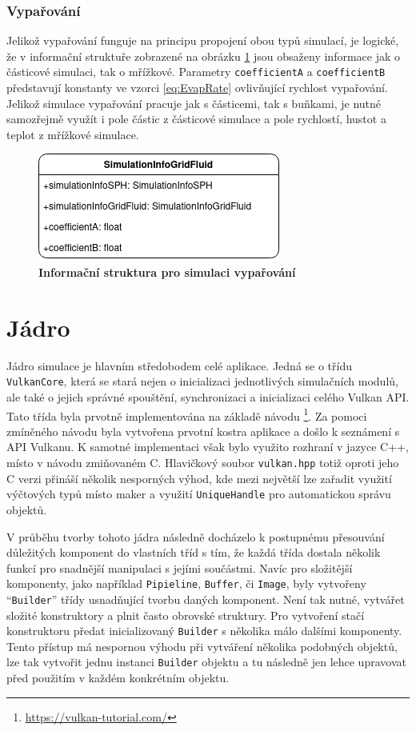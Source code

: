 \subsubsection{Vypařování}
Jelikož vypařování funguje na principu propojení obou typů simulací, je logické, že v informační struktuře zobrazené na obrázku \ref{fig:structsEvap} jsou obsaženy informace jak o částicové simulaci, tak o mřížkové. Parametry \texttt{coefficientA} a \texttt{coefficientB} představují konstanty ve vzorci \ref{eq:EvapRate} ovlivňující rychlost vypařování. Jelikož simulace vypařování pracuje jak s částicemi, tak s buňkami, je nutné samozřejmě využít i pole částic z částicové simulace a pole rychlostí, hustot a teplot z mřížkové simulace.

\begin{figure}[hbt]
	\centering
	\captionsetup{justification=centering}
	\includegraphics[scale=0.6]{obrazky-figures/SimulationInfo.png}
	\caption{\textbf{Informační struktura pro simulaci vypařování}}
	\label{fig:structsEvap}
\end{figure}


\section{Jádro}
\label{chapter:jadro}

Jádro simulace je hlavním středobodem celé aplikace. Jedná se o třídu \texttt{VulkanCore}, která se stará nejen o inicializaci jednotlivých simulačních modulů, ale také o jejich správné spouštění, synchronizaci a inicializaci celého Vulkan API. Tato třída byla prvotně implementována na základě návodu \footnote{\url{https://vulkan-tutorial.com/}}. Za pomoci zmíněného návodu byla vytvořena prvotní kostra aplikace a došlo k seznámení s API Vulkanu. K samotné implementaci však bylo využito rozhraní v jazyce C++, místo v návodu zmiňovaném C. Hlavičkový soubor \texttt{vulkan.hpp} totiž oproti jeho C verzi přináší několik nesporných výhod, kde mezi největší lze zařadit využití výčtových typů místo maker a využití \texttt{UniqueHandle} pro automatickou správu objektů. 

V průběhu tvorby tohoto jádra následně docházelo k postupnému přesouvání důležitých komponent do vlastních tříd s tím, že každá třída dostala několik funkcí pro snadnější manipulaci s jejími součástmi. Navíc pro složitější komponenty, jako například \texttt{Pipieline}, \texttt{Buffer}, či \texttt{Image}, byly vytvořeny \enquote{\texttt{Builder}} třídy usnadňující tvorbu daných komponent. Není tak nutné, vytvářet složité konstruktory a plnit často obrovské struktury. Pro vytvoření stačí konstruktoru předat inicializovaný \texttt{Builder} s několika málo dalšími komponenty. Tento přístup má nespornou výhodu při vytváření několika podobných objektů, lze tak vytvořit jednu instanci \texttt{Builder} objektu a tu následně jen lehce upravovat před použitím v každém konkrétním objektu.

